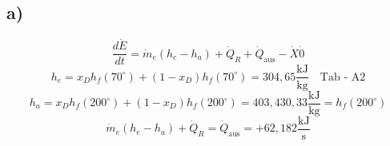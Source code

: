 

\subsection*{a)}
\[
\frac{d\dot{E}}{dt} = \dot{m}_e (h_e - h_a) + \dot{Q}_R + \dot{Q}_{\text{aus}} - \dot{X} \dot{0}
\]
\[
h_e = x_D h_f (70^\circ) + (1 - x_D) h_f (70^\circ) = 304,65 \frac{\text{kJ}}{\text{kg}} \quad \text{Tab - A2}
\]
\[
h_a = x_D h_f (200^\circ) + (1 - x_D) h_f (200^\circ) = 403,430,33 \frac{\text{kJ}}{\text{kg}} = h_f (200^\circ)
\]
\[
\dot{m}_e (h_e - h_a) + \dot{Q}_R = \dot{Q}_{\text{aus}} = + 62,182 \frac{\text{kJ}}{\text{s}}
\]
